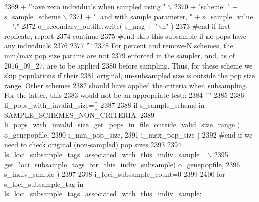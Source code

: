 \begin{DoxyCode}
2369                         + \textcolor{stringliteral}{"have zero individuals when sampled using "} \(\backslash\)
2370                         + \textcolor{stringliteral}{"scheme: "} + s\_sample\_scheme \(\backslash\)
2371                         + \textcolor{stringliteral}{", and with sample parameter, "} + s\_sample\_value + \textcolor{stringliteral}{"."}
2372                 o\_secondary\_outfile.write( s\_msg + \textcolor{stringliteral}{"\(\backslash\)n"} )
2373             \textcolor{comment}{#end if first replicate, report}
2374             \textcolor{keywordflow}{continue}
2375         \textcolor{comment}{#end skip this subsample if no pops have any individuals}
2376 
2377         \textcolor{stringliteral}{'''}
2378 \textcolor{stringliteral}{        For percent and remove-N schemes, the min/max pop size params are not }
2379 \textcolor{stringliteral}{        enforced in the sampler, and, as of 2016\_09\_27, are to be applied}
2380 \textcolor{stringliteral}{        before sampling.  Thus, for these scheme we skip populations if their }
2381 \textcolor{stringliteral}{        original, un-subsampled size is outside the pop size range.  Other schemes}
2382 \textcolor{stringliteral}{        should have applied the criteria when subsampling.  For the latter, this}
2383 \textcolor{stringliteral}{        would not be an appropriate test::}
2384 \textcolor{stringliteral}{        '''}
2385 
2386         li\_pops\_with\_invalid\_size=[]
2387         
2388         \textcolor{keywordflow}{if} s\_sample\_scheme \textcolor{keywordflow}{in} SAMPLE\_SCHEMES\_NON\_CRITERIA:
2389             li\_pops\_with\_invalid\_size=\hyperlink{namespacenegui_1_1pgdriveneestimator_a06645f9b380f736368e27585331ec22f}{get\_pops\_in\_file\_outside\_valid\_size\_range}
      ( o\_genepopfile, 
2390                                                                                 i\_min\_pop\_size,
2391                                                                                 i\_max\_pop\_size )
2392         \textcolor{comment}{#end if we need to check original (non-sampled) pop sizes}
2393 
2394         ls\_loci\_subsample\_tags\_associated\_with\_this\_indiv\_sample= \(\backslash\)
2395                 get\_loci\_subsample\_tags\_for\_this\_indiv\_subsample( o\_genepopfile,
2396                                                                     s\_indiv\_sample )
2397     
2398         i\_loci\_subsample\_count=0
2399 
2400         \textcolor{keywordflow}{for} s\_loci\_subsample\_tag \textcolor{keywordflow}{in} ls\_loci\_subsample\_tags\_associated\_with\_this\_indiv\_sample:

\end{DoxyCode}
